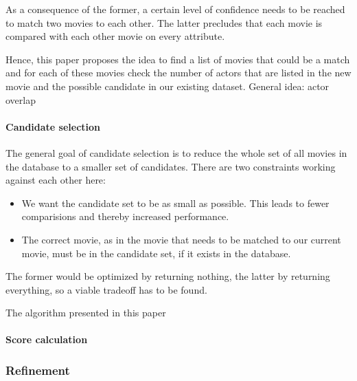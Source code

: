 As a consequence of the former, a certain level of confidence needs to be reached to match two movies to each other. The latter precludes that each movie is compared with each other movie on every attribute.

Hence, this paper proposes the idea to find a list of movies that could be a match and for each of these movies check the number of actors that are listed in the new movie and the possible candidate in our existing dataset.
General idea: actor overlap

\paragraph{Candidate selection}

The general goal of candidate selection is to reduce the whole set of all movies in the database to a smaller set of candidates.
There are two constraints working against each other here:
\begin{itemize}
	\item We want the candidate set to be as small as possible. This leads to fewer comparisions and thereby increased performance.
	\item The correct movie, as in the movie that needs to be matched to our current movie, must be in the candidate set, if it exists in the database.
\end{itemize}
The former would be optimized by returning nothing, the latter by returning everything, so a viable tradeoff has to be found.

The algorithm presented in this paper 
\paragraph{Score calculation}

\subsubsection{Refinement}